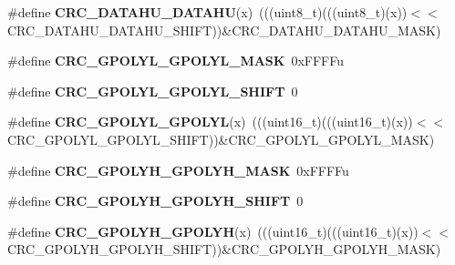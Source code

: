 \begin{DoxyCompactItemize}
\item 
\#define {\bfseries C\+R\+C\+\_\+\+D\+A\+T\+A\+H\+U\+\_\+\+D\+A\+T\+A\+HU}(x)~(((uint8\+\_\+t)(((uint8\+\_\+t)(x))$<$$<$C\+R\+C\+\_\+\+D\+A\+T\+A\+H\+U\+\_\+\+D\+A\+T\+A\+H\+U\+\_\+\+S\+H\+I\+FT))\&C\+R\+C\+\_\+\+D\+A\+T\+A\+H\+U\+\_\+\+D\+A\+T\+A\+H\+U\+\_\+\+M\+A\+SK)\hypertarget{group__CRC__Register__Masks_gae1736710c36588af1ecc3b6ecb3707e1}{}\label{group__CRC__Register__Masks_gae1736710c36588af1ecc3b6ecb3707e1}

\item 
\#define {\bfseries C\+R\+C\+\_\+\+G\+P\+O\+L\+Y\+L\+\_\+\+G\+P\+O\+L\+Y\+L\+\_\+\+M\+A\+SK}~0x\+F\+F\+F\+Fu\hypertarget{group__CRC__Register__Masks_ga7512a0f84b048e7a54207f9a7e619494}{}\label{group__CRC__Register__Masks_ga7512a0f84b048e7a54207f9a7e619494}

\item 
\#define {\bfseries C\+R\+C\+\_\+\+G\+P\+O\+L\+Y\+L\+\_\+\+G\+P\+O\+L\+Y\+L\+\_\+\+S\+H\+I\+FT}~0\hypertarget{group__CRC__Register__Masks_gaf4e5ed1d1478c1a6c8c5681e2b1d24aa}{}\label{group__CRC__Register__Masks_gaf4e5ed1d1478c1a6c8c5681e2b1d24aa}

\item 
\#define {\bfseries C\+R\+C\+\_\+\+G\+P\+O\+L\+Y\+L\+\_\+\+G\+P\+O\+L\+YL}(x)~(((uint16\+\_\+t)(((uint16\+\_\+t)(x))$<$$<$C\+R\+C\+\_\+\+G\+P\+O\+L\+Y\+L\+\_\+\+G\+P\+O\+L\+Y\+L\+\_\+\+S\+H\+I\+FT))\&C\+R\+C\+\_\+\+G\+P\+O\+L\+Y\+L\+\_\+\+G\+P\+O\+L\+Y\+L\+\_\+\+M\+A\+SK)\hypertarget{group__CRC__Register__Masks_ga5eb41c10ffbf64defaef2101a9036e32}{}\label{group__CRC__Register__Masks_ga5eb41c10ffbf64defaef2101a9036e32}

\item 
\#define {\bfseries C\+R\+C\+\_\+\+G\+P\+O\+L\+Y\+H\+\_\+\+G\+P\+O\+L\+Y\+H\+\_\+\+M\+A\+SK}~0x\+F\+F\+F\+Fu\hypertarget{group__CRC__Register__Masks_ga15ab1d296a857eebfbb3e5894ddd9302}{}\label{group__CRC__Register__Masks_ga15ab1d296a857eebfbb3e5894ddd9302}

\item 
\#define {\bfseries C\+R\+C\+\_\+\+G\+P\+O\+L\+Y\+H\+\_\+\+G\+P\+O\+L\+Y\+H\+\_\+\+S\+H\+I\+FT}~0\hypertarget{group__CRC__Register__Masks_ga62fa126178d7137b39b75ad2d63edae9}{}\label{group__CRC__Register__Masks_ga62fa126178d7137b39b75ad2d63edae9}

\item 
\#define {\bfseries C\+R\+C\+\_\+\+G\+P\+O\+L\+Y\+H\+\_\+\+G\+P\+O\+L\+YH}(x)~(((uint16\+\_\+t)(((uint16\+\_\+t)(x))$<$$<$C\+R\+C\+\_\+\+G\+P\+O\+L\+Y\+H\+\_\+\+G\+P\+O\+L\+Y\+H\+\_\+\+S\+H\+I\+FT))\&C\+R\+C\+\_\+\+G\+P\+O\+L\+Y\+H\+\_\+\+G\+P\+O\+L\+Y\+H\+\_\+\+M\+A\+SK)\hypertarget{group__CRC__Register__Masks_gaf8f26eea960e536b264b1a5b1d494b07}{}\label{group__CRC__Register__Masks_gaf8f26eea960e536b264b1a5b1d494b07}


\end{DoxyCompactItemize}
